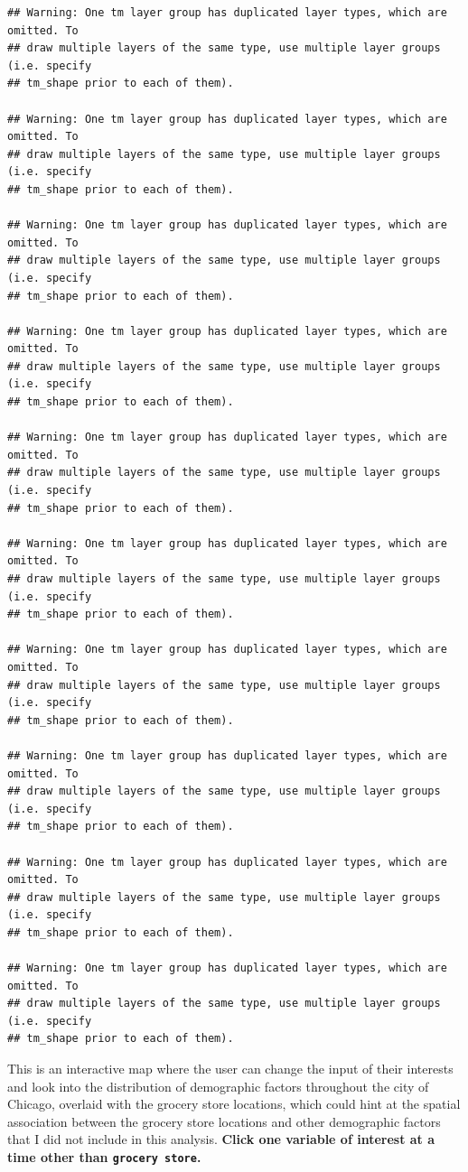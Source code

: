\documentclass[
]{article}
\begin{document}
\begin{verbatim}
## Warning: One tm layer group has duplicated layer types, which are omitted. To
## draw multiple layers of the same type, use multiple layer groups (i.e. specify
## tm_shape prior to each of them).

## Warning: One tm layer group has duplicated layer types, which are omitted. To
## draw multiple layers of the same type, use multiple layer groups (i.e. specify
## tm_shape prior to each of them).

## Warning: One tm layer group has duplicated layer types, which are omitted. To
## draw multiple layers of the same type, use multiple layer groups (i.e. specify
## tm_shape prior to each of them).

## Warning: One tm layer group has duplicated layer types, which are omitted. To
## draw multiple layers of the same type, use multiple layer groups (i.e. specify
## tm_shape prior to each of them).

## Warning: One tm layer group has duplicated layer types, which are omitted. To
## draw multiple layers of the same type, use multiple layer groups (i.e. specify
## tm_shape prior to each of them).

## Warning: One tm layer group has duplicated layer types, which are omitted. To
## draw multiple layers of the same type, use multiple layer groups (i.e. specify
## tm_shape prior to each of them).

## Warning: One tm layer group has duplicated layer types, which are omitted. To
## draw multiple layers of the same type, use multiple layer groups (i.e. specify
## tm_shape prior to each of them).

## Warning: One tm layer group has duplicated layer types, which are omitted. To
## draw multiple layers of the same type, use multiple layer groups (i.e. specify
## tm_shape prior to each of them).

## Warning: One tm layer group has duplicated layer types, which are omitted. To
## draw multiple layers of the same type, use multiple layer groups (i.e. specify
## tm_shape prior to each of them).

## Warning: One tm layer group has duplicated layer types, which are omitted. To
## draw multiple layers of the same type, use multiple layer groups (i.e. specify
## tm_shape prior to each of them).
\end{verbatim}

This is an interactive map where the user can change the input of their
interests and look into the distribution of demographic factors
throughout the city of Chicago, overlaid with the grocery store
locations, which could hint at the spatial association between the
grocery store locations and other demographic factors that I did not
include in this analysis. \textbf{Click one variable of interest at a
time other than \texttt{grocery\ store}.}
\end{document}
